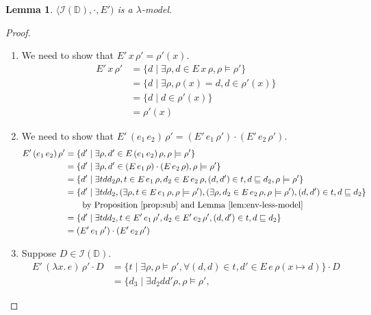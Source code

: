 \documentclass{tufte-handout}
\newcommand{\LAM}[1]{\lambda #1.\,}
\newcommand{\APP}[0]{\,}
\newcommand{\ext}[3]{#3(#1{\mapsto}#2)}
\newtheorem{lemma}[theorem]{Lemma}
\begin{document}
\begin{lemma}
\label{lem:ID-lambda-model}
$\langle \mathcal{I}(\mathbb{D}), \cdot, E')$ is a $\lambda$-model.
\end{lemma}
\begin{proof}\ 
\begin{enumerate}
\item We need to show that $E'\,x\,\rho' = \rho'(x)$.
  \begin{align*}
    E'\,x\,\rho' &=
    \{ d \mid \exists \rho, d \in E\,x\,\rho, \rho \models \rho'\}\\
    &= \{ d \mid \exists \rho, \rho(x)=d, d \in \rho'(x) \} \\
    &= \{ d \mid d \in \rho'(x) \} \\
    &= \rho'(x)
  \end{align*}
\item We need to show that
      $E'\,(e_1\APP e_2)\,\rho' = (E'\,e_1\,\rho') \cdot (E'\,e_2\,\rho')$.
  \begin{align*}
    E'\,(e_1\APP e_2)\,\rho' &=
    \{ d' \mid \exists \rho, d' \in E\,(e_1\APP e_2)\,\rho,
    \rho \models \rho'\} \\
    &= \{ d' \mid \exists \rho, d' \in (E\,e_1\,\rho) \cdot (E\,e_2\,\rho),
    \rho \models \rho' \} \\
    &= \{ d' \mid \exists  t d d_2 \rho,
    t \in E\,e_1\,\rho,  d_2 \in E\,e_2\,\rho, 
    (d,d') \in t, d \sqsubseteq d_2,
    \rho \models \rho' \} \\
    &= \{ d' \mid
    \exists t d d_2,
    (\exists \rho, t \in E\,e_1\,\rho,\rho\models\rho'),
    (\exists \rho, d_2 \in E\,e_2\,\rho,\rho \models \rho'),
    (d,d') \in t, d \sqsubseteq d_2
    \} \\
    & \qquad \text{by Proposition~\ref{prop:sub} and Lemma~\ref{lem:env-less-model}}\\
    &= \{ d' \mid
    \exists t d d_2, t \in E'\,e_1\,\rho',  d_2 \in E'\,e_2\,\rho',
    (d,d') \in t, d \sqsubseteq d_2
    \} \\
    &= (E'\,e_1\,\rho') \cdot (E'\,e_2\,\rho')
  \end{align*}
\item Suppose $D \in \mathcal{I}(\mathbb{D})$.
  \begin{align*}
    E'\,(\LAM{x}e)\,\rho' \cdot D &=
    \{ t \mid \exists \rho, \rho\models\rho',
          \forall (d,d)\in t, d' \in E\,e\,\ext{x}{d}{\rho} \} \cdot D \\
   &= \{ d_3 \mid \exists d_2 d d' \rho,
                  \rho\models\rho',

\end{align*}
\end{enumerate}
\end{proof}
\end{document}
